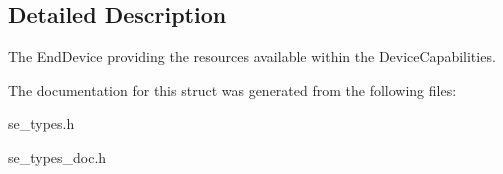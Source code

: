 \subsection{Detailed Description}
The End\+Device providing the resources available within the Device\+Capabilities. 

The documentation for this struct was generated from the following files\+:\begin{DoxyCompactItemize}
\item 
se\+\_\+types.\+h\item 
se\+\_\+types\+\_\+doc.\+h\end{DoxyCompactItemize}

